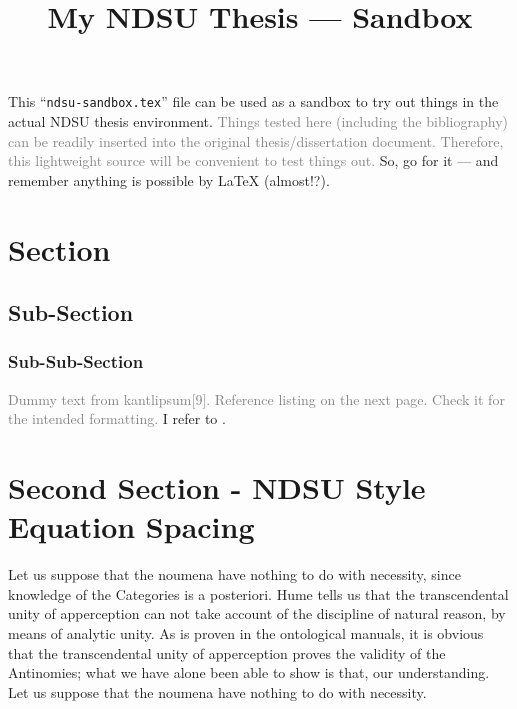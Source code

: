 \documentclass[12pt,chapterrefs]{ndsu-thesis-2022}
\title{My NDSU Thesis --- Sandbox}
\begin{document}

This ``\texttt{ndsu-sandbox.tex}'' file can be used as a sandbox to try out things in the actual NDSU thesis environment. \textcolor{gray}{Things tested here (including the bibliography) can be readily inserted into the original thesis/dissertation document. Therefore, this lightweight source will be convenient to test things out.} So, go for it --- and remember anything is possible by \LaTeX{} (almost!?).

\section{Section}
\subsection{Sub-Section}
\subsubsection{Sub-Sub-Section}

\textcolor{gray}{Dummy text from kantlipsum[9]. Reference listing on the next page. Check it for the intended formatting.} I refer to \citep{lamport94,kopka2004guide,baczkowski1990ndsu,cassuto2010advising,pires2021teens}. \kant[9]



\section{Second Section - NDSU Style Equation Spacing}

Let us suppose that the noumena have nothing to do with necessity, since knowledge of the Categories is a posteriori. Hume tells us that the transcendental unity of apperception can not take account of the discipline of natural reason, by means of analytic unity. As is proven in the ontological manuals, it is obvious that the transcendental unity of apperception proves the validity of the Antinomies; what we have alone been able to show is that, our understanding. Let us suppose that the noumena have nothing to do with necessity.

\end{document}
